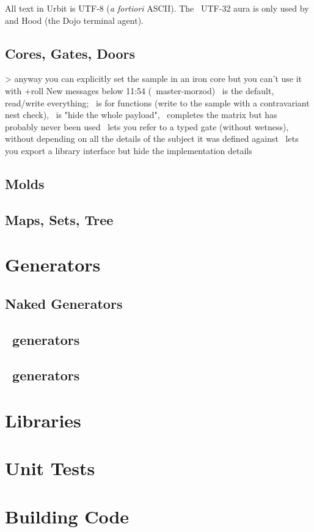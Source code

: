 

All text in Urbit is UTF-8 (\emph{a fortiori} ASCII).  The \patc~UTF-32 aura is only used by \dill and Hood (the Dojo terminal agent).


\subsection{Cores, Gates, Doors}

> anyway you can explicitly set the sample in an iron core
but you can't use it with +roll
New messages below
11:54 (~master-morzod)
\gold~is the default, read/write everything; \iron~is for functions (write to the sample with a contravariant nest check), \lead~is "hide the whole payload", \zinc~completes the matrix
but has probably never been used
\iron~lets you refer to a typed gate (without wetness), without depending on all the details of the subject it was defined against
\lead~lets you export a library interface but hide the implementation details

\subsection{Molds}

\subsection{Maps, Sets, Tree}

\section{Generators}

\subsection{Naked Generators}

\subsection{\say~generators}

\subsection{\ask~generators}

\section{Libraries}

\section{Unit Tests}

\section{Building Code}
